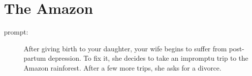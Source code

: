\section*{The Amazon}

\begin{description}
\item[prompt:] After giving birth to your daughter, your wife begins to suffer from post-partum depression. To fix it, she decides to take an impromptu trip to the Amazon rainforest. After a few more trips, she asks for a divorce.
\end{description}

